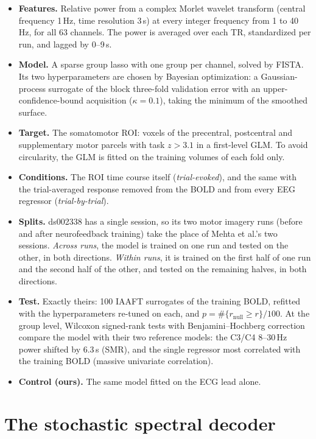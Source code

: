 \begin{itemize}
	\item \textbf{Features.} Relative power from a complex Morlet wavelet transform (central frequency 1\,Hz, time resolution 3\,s) at every integer frequency from 1 to 40\,Hz, for all 63 channels. The power is averaged over each TR, standardized per run, and lagged by 0--9\,s.
	\item \textbf{Model.} A sparse group lasso with one group per channel, solved by FISTA. Its two hyperparameters are chosen by Bayesian optimization: a Gaussian-process surrogate of the block three-fold validation error with an upper-confidence-bound acquisition ($\kappa=0.1$), taking the minimum of the smoothed surface.
	\item \textbf{Target.} The somatomotor ROI: voxels of the precentral, postcentral and supplementary motor parcels with task $z>3.1$ in a first-level GLM. To avoid circularity, the GLM is fitted on the training volumes of each fold only.
	\item \textbf{Conditions.} The ROI time course itself (\emph{trial-evoked}), and the same with the trial-averaged response removed from the BOLD and from every EEG regressor (\emph{trial-by-trial}).
	\item \textbf{Splits.} ds002338 has a single session, so its two motor imagery runs (before and after neurofeedback training) take the place of Mehta et al.'s two sessions. \emph{Across runs}, the model is trained on one run and tested on the other, in both directions. \emph{Within runs}, it is trained on the first half of one run and the second half of the other, and tested on the remaining halves, in both directions.
	\item \textbf{Test.} Exactly theirs: 100 IAAFT surrogates of the training BOLD, refitted with the hyperparameters re-tuned on each, and $p = \#\{r_{\mathrm{null}}\ge r\}/100$. At the group level, Wilcoxon signed-rank tests with Benjamini--Hochberg correction compare the model with their two reference models: the C3/C4 8--30\,Hz power shifted by 6.3\,s (SMR), and the single regressor most correlated with the training BOLD (massive univariate correlation).
	\item \textbf{Control (ours).} The same model fitted on the ECG lead alone.
\end{itemize}


\section{The stochastic spectral decoder}\label{supp:decoder}

